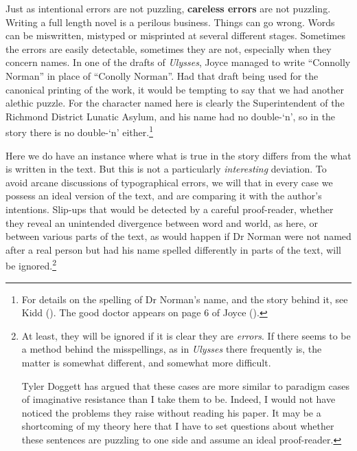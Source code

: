 \documentclass[
  10pt,
  letterpaper,
  DIV=11,
  numbers=noendperiod,
  twoside]{scrartcl}
\begin{document}
Just as intentional errors are not puzzling, \textbf{careless errors}
are not puzzling. Writing a full length novel is a perilous business.
Things can go wrong. Words can be miswritten, mistyped or misprinted at
several different stages. Sometimes the errors are easily detectable,
sometimes they are not, especially when they concern names. In one of
the drafts of \emph{Ulysses}, Joyce managed to write ``Connolly Norman''
in place of ``Conolly Norman''. Had that draft being used for the
canonical printing of the work, it would be tempting to say that we had
another alethic puzzle. For the character named here is clearly the
Superintendent of the Richmond District Lunatic Asylum, and his name had
no double-`n', so in the story there is no double-`n' either.\footnote{For
  details on the spelling of Dr Norman's name, and the story behind it,
  see Kidd (). The good doctor appears on
  page 6 of Joyce ().}

Here we do have an instance where what is true in the story differs from
the what is written in the text. But this is not a particularly
\emph{interesting} deviation. To avoid arcane discussions of
typographical errors, we will that in every case we possess an ideal
version of the text, and are comparing it with the author's intentions.
Slip-ups that would be detected by a careful proof-reader, whether they
reveal an unintended divergence between word and world, as here, or
between various parts of the text, as would happen if Dr Norman were not
named after a real person but had his name spelled differently in parts
of the text, will be ignored.\footnote{At least, they will be ignored if
  it is clear they are \emph{errors}. If there seems to be a method
  behind the misspellings, as in \emph{Ulysses} there frequently is, the
  matter is somewhat different, and somewhat more difficult.

  Tyler Doggett has argued that these cases are more similar to paradigm
  cases of imaginative resistance than I take them to be. Indeed, I
  would not have noticed the problems they raise without reading his
  paper. It may be a shortcoming of my theory here that I have to set
  questions about whether these sentences are puzzling to one side and
  assume an ideal proof-reader.}
\end{document}
